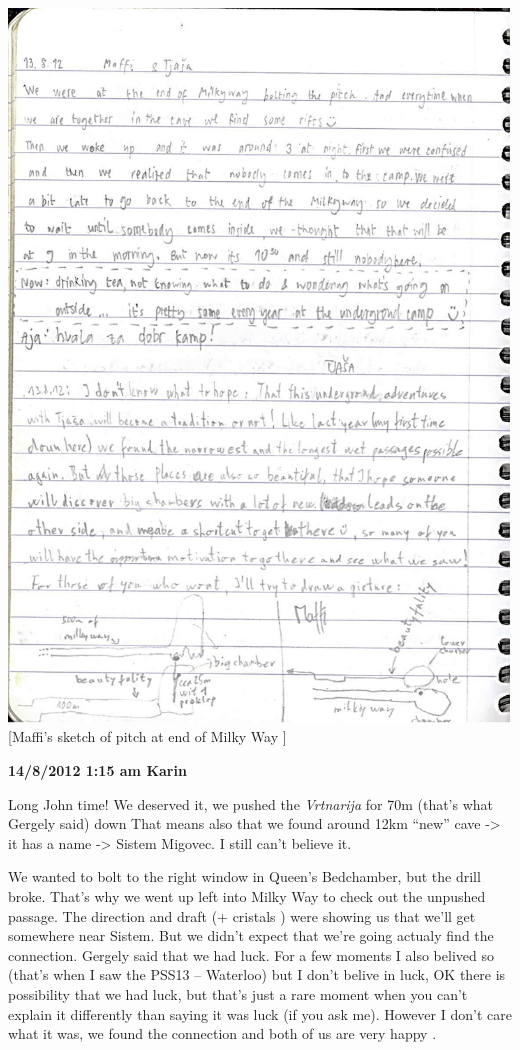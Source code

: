 \includegraphics{UgLog1012/90.jpeg}\\
{[}Maffi's sketch of pitch at end of Milky Way {]}

\textbf{14/8/2012 1:15 am Karin}

Long John time! We deserved it, we pushed the \emph{Vrtnarija} for 70m
(that's what Gergely said) down That means also that we found around
12km ``new'' cave -\textgreater{} it has a name -\textgreater{} Sistem
Migovec. I still can't believe it.

We wanted to bolt to the right window in Queen's Bedchamber, but the
drill broke. That's why we went up left into Milky Way to check out the
unpushed passage. The direction and draft (+ cristals ) were showing us
that we'll get somewhere near Sistem. But we didn't expect that we're
going actualy find the connection. Gergely said that we had luck. For a
few moments I also belived so (that's when I saw the PSS13 -- Waterloo)
but I don't belive in luck, OK there is possibility that we had luck,
but that's just a rare moment when you can't explain it differently than
saying it was luck (if you ask me). However I don't care what it was, we
found the connection and both of us are very happy .

